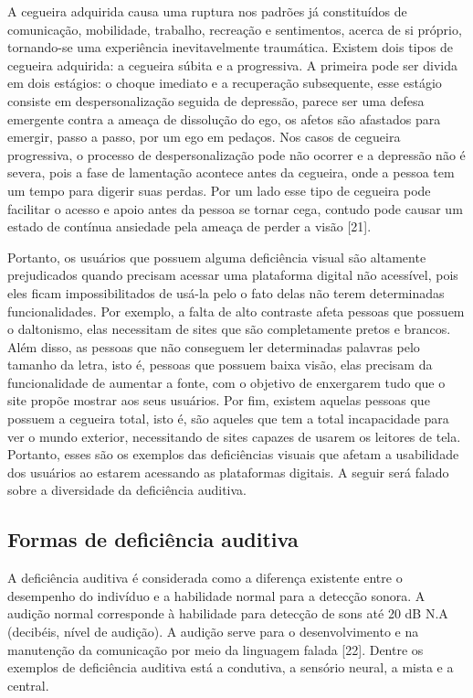 \documentclass[a4paper]{article}
\begin{document}
\begin{titlepage}
A cegueira adquirida causa uma ruptura nos padrões já constituídos de comunicação, mobilidade, trabalho, recreação e sentimentos, acerca de si próprio, tornando-se uma experiência inevitavelmente traumática. Existem dois tipos de cegueira adquirida: a cegueira súbita e a progressiva. A primeira pode ser divida em dois estágios: o choque imediato e a recuperação subsequente, esse estágio consiste em despersonalização seguida de depressão, parece ser uma defesa emergente contra a ameaça de dissolução do ego, os afetos são afastados para emergir, passo a passo, por um ego em pedaços. Nos casos de cegueira progressiva, o processo de despersonalização pode não ocorrer e a depressão não é severa, pois a fase de lamentação acontece antes da cegueira, onde a pessoa tem um tempo para digerir suas perdas. Por um lado esse tipo de cegueira pode facilitar o acesso e apoio antes da pessoa se tornar cega, contudo pode causar um estado de contínua ansiedade pela ameaça de perder a visão [21].

Portanto, os usuários que possuem alguma deficiência visual são altamente prejudicados quando precisam acessar uma plataforma digital não acessível, pois eles ficam impossibilitados de usá-la pelo o fato delas não terem determinadas funcionalidades. Por exemplo, a falta de alto contraste afeta pessoas que possuem o daltonismo, elas necessitam de sites que são completamente pretos e brancos. Além disso, as pessoas que não conseguem ler determinadas palavras pelo tamanho da letra, isto é, pessoas que possuem baixa visão, elas precisam da funcionalidade de aumentar a fonte, com o objetivo de enxergarem tudo que o site propõe mostrar aos seus usuários. Por fim, existem aquelas pessoas que possuem a cegueira total, isto é, são aqueles que tem a total incapacidade para ver o mundo exterior, necessitando de sites capazes de usarem os leitores de tela. Portanto, esses são os exemplos das deficiências visuais que afetam a usabilidade dos usuários ao estarem acessando as plataformas digitais. A seguir será falado sobre a diversidade da deficiência auditiva.

\subsection{Formas de deficiência auditiva}
A deficiência auditiva é considerada como a diferença existente entre o desempenho do indivíduo e a habilidade normal para a detecção sonora. A audição normal corresponde à habilidade para detecção de sons até 20 dB N.A (decibéis, nível de audição). A audição serve para o desenvolvimento e na manutenção da comunicação por meio da linguagem falada [22]. Dentre os exemplos de deficiência auditiva está a condutiva, a sensório neural, a mista e a central.


\end{titlepage}
\end{document}
